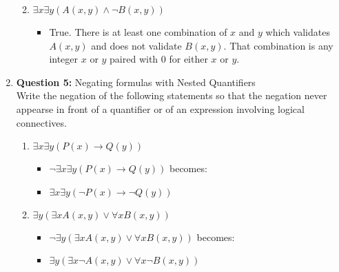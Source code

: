 \documentclass[11pt]{article}
\begin{document}
\begin{enumerate}
\begin{enumerate}[label=(\alph*)]
\begin{itemize}
\end{itemize}
\item 
$\exists x \exists y (A(x,y) \wedge \lnot B(x,y))$
\begin{itemize}
    \item 
    True. There is at least one combination of $x$ and $y$ which validates $A(x,y)$ and does not validate $B(x,y)$. That combination is any integer $x$ or $y$ paired with 0 for either $x$ or $y$.
\end{itemize}
\end{enumerate}
\item 
\textbf{Question 5:} Negating formulas with Nested Quantifiers \\
Write the negation of the following statements so that the negation never appearse in front of a quantifier or of an expression involving logical connectives.
\begin{enumerate}[label=(\alph*)]
\item 
$\exists x \exists y (P(x) \rightarrow Q(y))$
\begin{itemize}
    \item 
    $ \lnot \exists x \exists y ( P(x) \rightarrow Q(y))$ becomes: 
    \item 
    $\exists x \exists y (\lnot P(x) \rightarrow \lnot Q(y))$
\end{itemize}
\item 
$\exists y(\exists x A(x,y) \vee \forall xB(x,y))$
\begin{itemize}
    \item 
    $\lnot \exists y(\exists x A(x,y) \vee \forall x B(x,y))$ becomes: 
    \item
    $\exists y(\exists x \lnot A(x,y) \vee \forall x \lnot B(x,y))$
\end{itemize}
\end{enumerate}
\end{enumerate}
\end{document}
